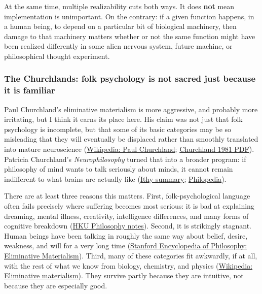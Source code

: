 At the same time, multiple realizability cuts both ways. It does \textbf{not} mean implementation is unimportant. On the contrary: if a given function happens, in a human being, to depend on a particular bit of biological machinery, then damage to that machinery matters whether or not the same function might have been realized differently in some alien nervous system, future machine, or philosophical thought experiment.

\subsubsection{The Churchlands: folk psychology is not sacred just because it is familiar}\label{03_it_started-the-churchlands-folk-psychology-is-not-sacred-just-because-it-is-familiar}

Paul Churchland's eliminative materialism is more aggressive, and probably more irritating, but I think it earns its place here. His claim was not just that folk psychology is incomplete, but that some of its basic categories may be so misleading that they will eventually be displaced rather than smoothly translated into mature neuroscience (\href{https://en.wikipedia.org/wiki/Paul_Churchland}{Wikipedia: Paul Churchland}; \href{https://www.sfu.ca/~kathleea/docs/Eliminative\%20materialism.pdf}{Churchland 1981 PDF}). Patricia Churchland's \emph{Neurophilosophy} turned that into a broader program: if philosophy of mind wants to talk seriously about minds, it cannot remain indifferent to what brains are actually like (\href{https://ithy.com/article/patricia-churchland-summary-i5g7z3k2}{Ithy summary}; \href{https://philopedia.org/thinkers/patricia-smith-churchland/}{Philopedia}).

There are at least three reasons this matters. First, folk-psychological language often fails precisely where suffering becomes most serious: it is bad at explaining dreaming, mental illness, creativity, intelligence differences, and many forms of cognitive breakdown (\href{https://philosophy.hku.hk/courses/old/ronmallon/phil2230/phil2230l13.html}{HKU Philosophy notes}). Second, it is strikingly stagnant. Human beings have been talking in roughly the same way about belief, desire, weakness, and will for a very long time (\href{https://plato.stanford.edu/entries/materialism-eliminative/}{Stanford Encyclopedia of Philosophy: Eliminative Materialism}). Third, many of these categories fit awkwardly, if at all, with the rest of what we know from biology, chemistry, and physics (\href{https://en.wikipedia.org/wiki/Eliminative_materialism}{Wikipedia: Eliminative materialism}). They survive partly because they are intuitive, not because they are especially good.

